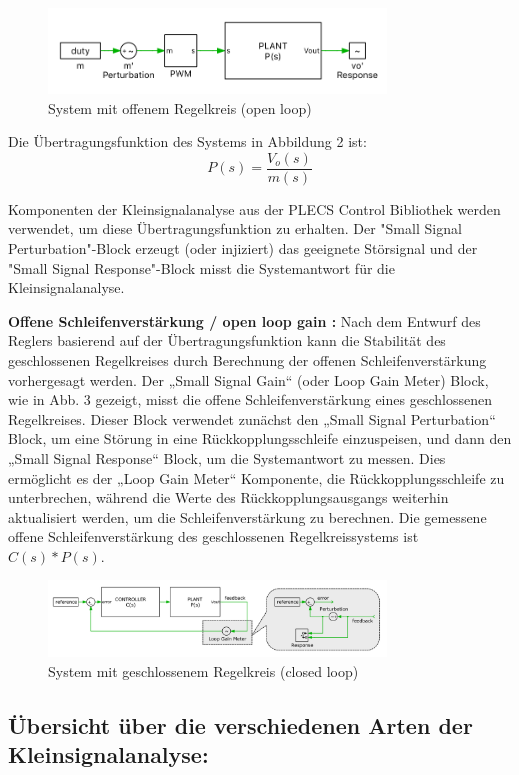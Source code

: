 \documentclass[a4paper,11pt,oneside]{article}
\begin{document}
	\begin{figure}[H]
		\centering
		\includegraphics[width=0.8\textwidth]{open_loop.png}
		\caption{System mit offenem Regelkreis (open loop)}
	\end{figure}
	
	Die Übertragungsfunktion des Systems in Abbildung 2 ist:
	\[ P(s) = \frac{V_o(s)}{m(s)} \]
	
	Komponenten der Kleinsignalanalyse aus der PLECS Control Bibliothek werden verwendet, um diese Übertragungsfunktion zu erhalten. Der "Small Signal Perturbation"-Block erzeugt (oder injiziert) das geeignete Störsignal und der "Small Signal Response"-Block misst die Systemantwort für die Kleinsignalanalyse.
	
	\textbf{Offene Schleifenverstärkung / open loop gain :}
	Nach dem Entwurf des Reglers basierend auf der Übertragungsfunktion kann die Stabilität des geschlossenen Regelkreises durch Berechnung der offenen Schleifenverstärkung vorhergesagt werden.
	Der „Small Signal Gain“ (oder Loop Gain Meter) Block, wie in Abb. 3 gezeigt, misst die offene Schleifenverstärkung eines geschlossenen Regelkreises. Dieser Block verwendet zunächst den „Small Signal Perturbation“ Block, um eine Störung in eine Rückkopplungsschleife einzuspeisen, und dann den „Small Signal Response“ Block, um die Systemantwort zu messen. Dies ermöglicht es der „Loop Gain Meter“ Komponente, die Rückkopplungsschleife zu unterbrechen, während die Werte des Rückkopplungsausgangs weiterhin aktualisiert werden, um die Schleifenverstärkung zu berechnen. Die gemessene offene Schleifenverstärkung des geschlossenen Regelkreissystems ist $C(s)*P(s)$.
	\begin{figure}[H]
		\centering
		\includegraphics[width=0.8\textwidth]{closed_loop.png}
		\caption{System mit geschlossenem Regelkreis (closed loop)}
	\end{figure}
	
	\subsection{Übersicht über die verschiedenen Arten der Kleinsignalanalyse:}
	
\end{document}
